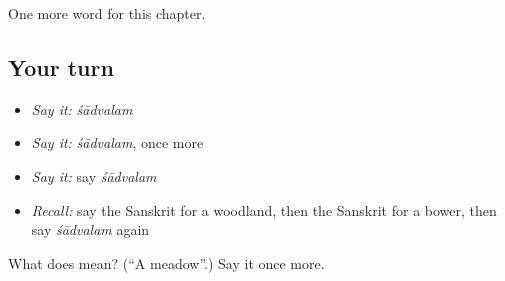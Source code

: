 \begin{grammarlens}[title={What you've built}]
One more word for this chapter.
\end{grammarlens}

\subsection*{Your turn}
\begin{itemize}
\raggedright
  \item \emph{Say it:} \emph{śādvalam}
  \item \emph{Say it:} \emph{śādvalam}, once more
  \item \emph{Say it:} say \emph{śādvalam}
  \item \emph{Recall:} say the Sanskrit for a woodland, then the Sanskrit for a bower, then say \emph{śādvalam} again
\end{itemize}

\begin{tcolorbox}[breakable,colback=teal!4,colframe=teal!35!black,title={Before you move on}]
What does  mean? (\textquotedblleft{}A meadow\textquotedblright{}.) Say it once more.
\end{tcolorbox}
